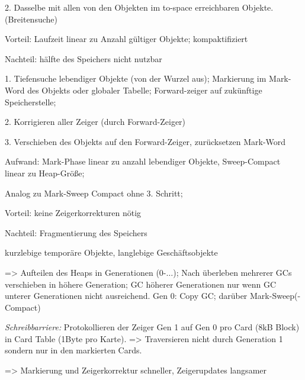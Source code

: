 2. Dasselbe mit allen von den Objekten im to-space erreichbaren Objekte. (Breitensuche)

Vorteil: Laufzeit linear zu Anzahl gültiger Objekte; kompaktifiziert

Nachteil: hälfte des Speichers nicht nutzbar


1. Tiefensuche lebendiger Objekte (von der Wurzel aus); Markierung im Mark-Word des Objekts oder globaler Tabelle; Forward-zeiger auf zukünftige Speicherstelle;

2. Korrigieren aller Zeiger (durch Forward-Zeiger)

3. Verschieben des Objekts auf den Forward-Zeiger, zurücksetzen Mark-Word 

Aufwand: Mark-Phase linear zu anzahl lebendiger Objekte, Sweep-Compact linear zu Heap-Größe;

Analog zu Mark-Sweep Compact ohne 3. Schritt; 

Vorteil: keine Zeigerkorrekturen nötig

Nachteil: Fragmentierung des Speichers

kurzlebige temporäre Objekte, langlebige Geschäftsobjekte

=> Aufteilen des Heaps in Generationen (0-$\dots$); Nach überleben mehrerer GCs verschieben in höhere Generation; GC höherer Generationen nur wenn GC unterer Generationen nicht ausreichend. Gen 0: Copy GC; darüber Mark-Sweep(-Compact)

\textit{Schreibbarriere:} Protokollieren der Zeiger Gen 1 auf Gen 0 pro Card (8kB Block) in Card Table (1Byte pro Karte). => Traversieren nicht durch Generation 1 sondern nur in den markierten Cards. 

=> Markierung und Zeigerkorrektur schneller, Zeigerupdates langsamer


